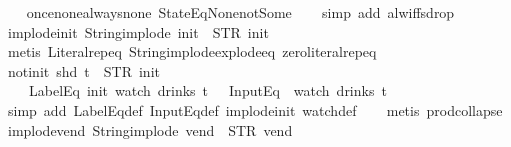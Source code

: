 \begin{isabellebody}
%
\isadelimproof
\ \ %
\endisadelimproof
%
\isatagproof
{}\isamarkupfalse%
\ once{\isacharunderscore}none{\isacharunderscore}always{\isacharunderscore}none\ StateEq{\isacharunderscore}None{\isacharunderscore}not{\isacharunderscore}Some\isanewline
\ \ \isamarkupfalse%
\ {\isacharparenleft}simp\ add{\isacharcolon}\ alw{\isacharunderscore}iff{\isacharunderscore}sdrop{\isacharparenright}%
\endisatagproof
{\isafoldproof}%
%
\isadelimproof
\isanewline
%
\endisadelimproof
\isanewline
{}\isamarkupfalse%
\ implode{\isacharunderscore}init{\isacharcolon}\ {\isachardoublequoteopen}String{\isachardot}implode\ {\isacharprime}{\isacharprime}init{\isacharprime}{\isacharprime}\ {\isacharequal}\ STR\ {\isacharprime}{\isacharprime}init{\isacharprime}{\isacharprime}{\isachardoublequoteclose}\isanewline
%
\isadelimproof
\ \ %
\endisadelimproof
%
\isatagproof
{}\isamarkupfalse%
\ {\isacharparenleft}metis\ Literal{\isachardot}rep{\isacharunderscore}eq\ String{\isachardot}implode{\isacharunderscore}explode{\isacharunderscore}eq\ zero{\isacharunderscore}literal{\isachardot}rep{\isacharunderscore}eq{\isacharparenright}%
\endisatagproof
{\isafoldproof}%
%
\isadelimproof
\isanewline
%
\endisadelimproof
\isanewline
{}\isamarkupfalse%
\ not{\isacharunderscore}init{\isacharcolon}\ {\isachardoublequoteopen}shd\ t\ {\isasymnoteq}\ {\isacharparenleft}STR\ {\isacharprime}{\isacharprime}init{\isacharprime}{\isacharprime}{\isacharcomma}\ {\isacharbrackleft}{\isacharbrackright}{\isacharparenright}\ {\isasymLongrightarrow}\isanewline
\ \ \ \ LabelEq\ {\isacharprime}{\isacharprime}init{\isacharprime}{\isacharprime}\ {\isacharparenleft}watch\ drinks\ t{\isacharparenright}\ {\isasymLongrightarrow}\ {\isasymnot}\ InputEq\ {\isacharbrackleft}{\isacharbrackright}\ {\isacharparenleft}watch\ drinks\ t{\isacharparenright}{\isachardoublequoteclose}\isanewline
%
\isadelimproof
\ \ %
\endisadelimproof
%
\isatagproof
{}\isamarkupfalse%
\ {\isacharparenleft}simp\ add{\isacharcolon}\ LabelEq{\isacharunderscore}def\ InputEq{\isacharunderscore}def\ implode{\isacharunderscore}init\ watch{\isacharunderscore}def{\isacharparenright}\isanewline
\ \ \isamarkupfalse%
\ {\isacharparenleft}metis\ prod{\isachardot}collapse{\isacharparenright}%
\endisatagproof
{\isafoldproof}%
%
\isadelimproof
\isanewline
%
\endisadelimproof
\isanewline
{}\isamarkupfalse%
\ implode{\isacharunderscore}vend{\isacharcolon}\ {\isachardoublequoteopen}String{\isachardot}implode\ {\isacharprime}{\isacharprime}vend{\isacharprime}{\isacharprime}\ {\isacharequal}\ STR\ {\isacharprime}{\isacharprime}vend{\isacharprime}{\isacharprime}{\isachardoublequoteclose}\isanewline

\end{isabellebody}
